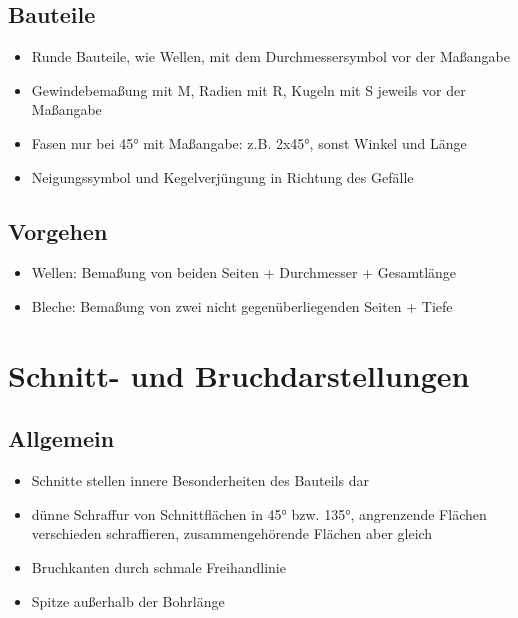 \documentclass[a4paper,parskip=half*,DIV=7,fontsize=11pt]{scrartcl}
\begin{document}
\subsection{Bauteile}
\begin{itemize}
	\item Runde Bauteile, wie Wellen, mit dem Durchmessersymbol vor der Maßangabe
	\item Gewindebemaßung mit M, Radien mit R, Kugeln mit S jeweils vor der Maßangabe
	\item Fasen nur bei 45° mit Maßangabe: z.B. 2x45°, sonst Winkel und Länge
	\item Neigungssymbol und Kegelverjüngung in Richtung des Gefälle
\end{itemize}

\subsection{Vorgehen}
\begin{itemize}
	\item Wellen: Bemaßung von beiden Seiten + Durchmesser + Gesamtlänge
	\item Bleche: Bemaßung von zwei nicht gegenüberliegenden Seiten + Tiefe
\end{itemize}
	
	
\section{Schnitt- und Bruchdarstellungen}
\subsection{Allgemein}
\begin{itemize}
	\item Schnitte stellen innere Besonderheiten des Bauteils dar
	\item dünne Schraffur von Schnittflächen in 45° bzw. 135°, angrenzende Flächen verschieden schraffieren, zusammengehörende Flächen aber gleich
	\item Bruchkanten durch schmale Freihandlinie
	\item Spitze außerhalb der Bohrlänge
\end{itemize}
		
\end{document}
